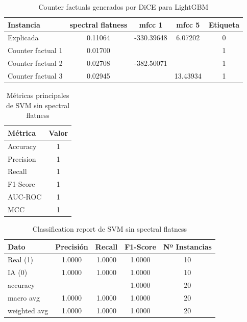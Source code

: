 \begin{table}
\centering
\begin{tabular}{lcccc}
\toprule
\textbf{Instancia} & \textbf{spectral flatness} & \textbf{mfcc 1} & \textbf{mfcc 5} & \textbf{Etiqueta} \\
\midrule
Explicada & 0.11064 & -330.39648 & 6.07202 & 0 \\
Counter factual 1 & 0.01700 &  &  & 1 \\
Counter factual 2 & 0.02708 & -382.50071 &  & 1 \\
Counter factual 3 & 0.02945 &  & 13.43934 & 1 \\
\bottomrule
\end{tabular}
\caption{Counter factuals generados por DiCE para LightGBM}
\label{tab:dice_lgbm}
\end{table}

\begin{table}
\centering
\begin{tabular}{lc}
\toprule
\textbf{Métrica} & \textbf{Valor}\\
\midrule
Accuracy & 1 \\
Precision & 1 \\
Recall & 1 \\
F1-Score & 1  \\
AUC-ROC & 1 \\
MCC & 1 \\ 
\bottomrule
\end{tabular}
\caption{Métricas principales de SVM sin spectral flatness}
\label{tab:metricas_principales_svm_sin_specflat}
\end{table}

\begin{table}
\centering
\begin{tabular}{lcccc}
\toprule
\textbf{Dato} & \textbf{Precisión} & \textbf{Recall} & \textbf{F1-Score} & \textbf{Nº Instancias} \\
\midrule
Real (1) & 1.0000 & 1.0000 & 1.0000 & 10 \\
IA (0) & 1.0000 & 1.0000 & 1.0000 & 10 \\
accuracy &  &  & 1.0000 & 20 \\
macro avg & 1.0000 & 1.0000 & 1.0000 & 20 \\
weighted avg & 1.0000 & 1.0000 & 1.0000 & 20 \\
\bottomrule
\end{tabular}
\caption{Classification report de SVM sin spectral flatness}
\label{tab:classification_report_svm_sin_specflat}
\end{table}

